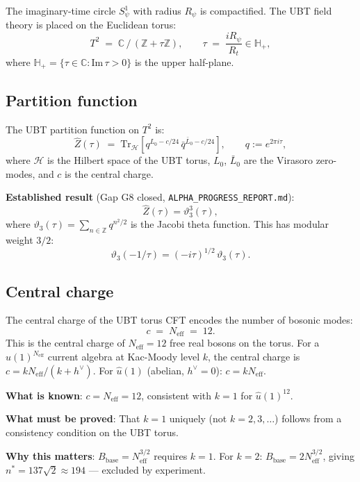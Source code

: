 \documentclass[12pt,a4paper]{article}
\theoremstyle{definition}
\theoremstyle{remark}
\newcommand{\vth}{\vartheta}
\begin{document}
The imaginary-time circle $S^1_\psi$ with radius $R_\psi$ is compactified.
The UBT field theory is placed on the Euclidean torus:
\[
  T^2 \;=\; \mathbb{C}\,\big/\,(\mathbb{Z}+\tau\mathbb{Z}),
  \qquad \tau \;=\; \frac{iR_\psi}{R_t} \in \mathbb{H}_+,
\]
where $\mathbb{H}_+ = \{\tau \in \mathbb{C} : \mathrm{Im}\,\tau > 0\}$ is
the upper half-plane.

\subsection{Partition function}

The UBT partition function on $T^2$ is:
\begin{equation}
\label{eq:partition}
  \hat{Z}(\tau) \;=\; \mathrm{Tr}_{\mathcal{H}}\!\left[
    q^{L_0 - c/24}\,\bar{q}^{\bar{L}_0 - c/24}
  \right],
  \qquad q := e^{2\pi i\tau},
\end{equation}
where $\mathcal{H}$ is the Hilbert space of the UBT torus, $L_0$, $\bar{L}_0$
are the Virasoro zero-modes, and $c$ is the central charge.

\textbf{Established result} (Gap G8 closed, \texttt{ALPHA\_PROGRESS\_REPORT.md}):
\begin{equation}
\label{eq:z_theta3}
  \hat{Z}(\tau) = \vth_3^3(\tau),
\end{equation}
where $\vth_3(\tau) = \sum_{n\in\mathbb{Z}} q^{n^2/2}$ is the Jacobi theta
function.  This has modular weight $3/2$:
\[
  \vth_3(-1/\tau) = (-i\tau)^{1/2}\,\vth_3(\tau).
\]

\subsection{Central charge}

The central charge of the UBT torus CFT encodes the number of bosonic modes:
\[
  c \;=\; N_{\mathrm{eff}} \;=\; 12.
\]
This is the central charge of $N_{\mathrm{eff}} = 12$ free real bosons on the torus.
For a $\hat{u}(1)^{N_{\mathrm{eff}}}$ current algebra at Kac-Moody level $k$,
the central charge is $c = kN_{\mathrm{eff}}/(k+h^\vee)$.  For $\hat{u}(1)$
(abelian, $h^\vee = 0$): $c = k N_{\mathrm{eff}}$.

\begin{tcolorbox}[colback=yellow!5!white,colframe=orange!60!black,
  title={\textbf{Gap G3-k}: Kac-Moody Level $k=1$}]
\textbf{What is known}: $c = N_{\mathrm{eff}} = 12$, consistent with $k=1$ for
$\hat{u}(1)^{12}$.

\textbf{What must be proved}: That $k = 1$ uniquely (not $k = 2, 3, \ldots$)
follows from a consistency condition on the UBT torus.

\textbf{Why this matters}: $B_{\mathrm{base}} = N_{\mathrm{eff}}^{3/2}$
requires $k = 1$.  For $k = 2$: $B_{\mathrm{base}} = 2N_{\mathrm{eff}}^{3/2}$,
giving $n^* = 137\sqrt{2} \approx 194$ — excluded by experiment.
\end{tcolorbox}
\end{document}
